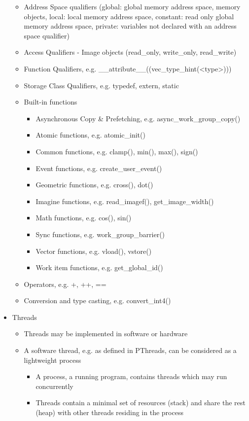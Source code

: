 \documentclass[paper=a4, fontsize=11pt]{scrartcl} %
\numberwithin{equation}{section} %
\numberwithin{figure}{section} %
\numberwithin{table}{section} %
\begin{document}
\begin{itemize}
\begin{itemize}
    \item Address Space qualifiers (global: global memory address space, memory objects, local: local memory address space, constant: read only global memory address space, private: variables not declared with an address space qualifier)
    \item Access Qualifiers - Image objects (read_only, write_only, read_write)
    \item Function Qualifiers, e.g. __attribute__((vec_type_hint(<type>)))
    \item Storage Class Qualifiers, e.g. typedef, extern, static
    \item Built-in functions
    \begin{itemize}
      \item Asynchronous Copy \& Prefetching, e.g. async_work_group_copy()
      \item Atomic functions, e.g. atomic_init()
      \item Common functions, e.g. clamp(), min(), max(), sign()
      \item Event functions, e.g. create_user_event()
      \item Geometric functions, e.g. cross(), dot()
      \item Imagine functions, e.g. read_imagef(), get_image_width()
      \item Math functions, e.g. cos(), sin()
      \item Sync functions, e.g. work_group_barrier()
      \item Vector functions, e.g. vload(), vstore()
      \item Work item functions, e.g. get_global_id()
    \end{itemize}
    \item Operators, e.g. +, ++, ==
    \item Conversion and type casting, e.g. convert_int4()
  \end{itemize}
  \item Threads
  \begin{itemize}
    \item Threads may be implemented in software or hardware
    \item A software thread, e.g. as defined in PThreads, can be considered as a lightweight process
    \begin{itemize}
      \item A process, a running program, contains threads which may run concurrently
      \item Threads contain a minimal set of resources (stack) and share the rest (heap) with other threads residing in the process

\end{itemize}
\end{itemize}
\end{itemize}
\end{document}
